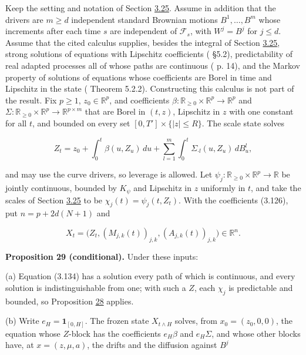 \documentclass[11pt]{article}
\begin{document}
Keep the setting and notation of Section \hyperref[sec:3.25]{3.25}. Assume in addition that the drivers are \(m\ge d\) independent standard Brownian motions \(B^1,\dots,B^m\) whose increments after each time \(s\) are independent of \(\mathcal F_s\), with \(W^j=B^j\) for \(j\le d\). Assume that the cited calculus supplies, besides the integral of Section \hyperref[sec:3.25]{3.25}, strong solutions of equations with Lipschitz coefficients (\cite{bauerschmidt2020stochastic} §5.2), predictability of real adapted processes all of whose paths are continuous (\cite{bauerschmidt2020stochastic} p. 14), and the Markov property of solutions of equations whose coefficients are Borel in time and Lipschitz in the state (\cite{vanhandel2007stochastic} Theorem 5.2.2). Constructing this calculus is not part of the result. Fix \(p\ge1\), \(z_0\in\mathbb R^p\), and coefficients \(\beta:\mathbb R_{\ge0}\times\mathbb R^p\to\mathbb R^p\) and \(\Sigma:\mathbb R_{\ge0}\times\mathbb R^p\to\mathbb R^{p\times m}\) that are Borel in \((t,z)\), Lipschitz in \(z\) with one constant for all \(t\), and bounded on every set \([0,T']\times\{|z|\le R\}\). The scale state solves

\begin{equation*}
Z_t=z_0+\int_0^t\beta(u,Z_u)\,du+\sum_{l=1}^m\int_0^t\Sigma_{\cdot l}(u,Z_u)\,dB^l_u, \tag{3.134}\label{eq:3.134}
\end{equation*}

and may use the curve drivers, so leverage is allowed. Let \(\psi_j:\mathbb R_{\ge0}\times\mathbb R^p\to\mathbb R\) be jointly continuous, bounded by \(K_\psi\) and Lipschitz in \(z\) uniformly in \(t\), and take the scales of Section \hyperref[sec:3.25]{3.25} to be \(\chi_j(t)=\psi_j(t,Z_t)\). With the coefficients (3.126), put \(n=p+2d(N+1)\) and

\begin{equation*}
X_t=\bigl(Z_t,(M_{j,k}(t))_{j,k},(A_{j,k}(t))_{j,k}\bigr)\in\mathbb R^n. \tag{3.135}\label{eq:3.135}
\end{equation*}

\label{res:Proposition-29}
\textbf{Proposition 29 (conditional).} Under these inputs:

(a) Equation (3.134) has a solution every path of which is continuous, and every solution is indistinguishable from one; with such a \(Z\), each \(\chi_j\) is predictable and bounded, so Proposition \hyperref[res:Proposition-28]{28} applies.

(b) Write \(e_H=\mathbf 1_{[0,H]}\). The frozen state \(X_{t\wedge H}\) solves, from \(x_0=(z_0,0,0)\), the equation whose \(Z\)-block has the coefficients \(e_H\beta\) and \(e_H\Sigma\), and whose other blocks have, at \(x=(z,\mu,a)\), the drifts and the diffusion against \(B^j\)
\end{document}
